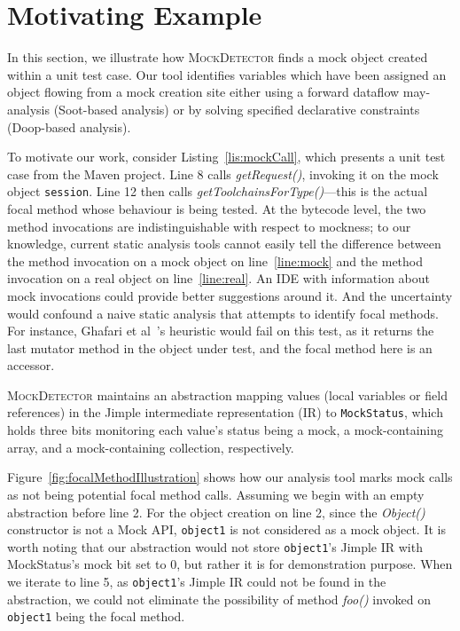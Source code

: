 \section{Motivating Example}
\label{sec:motivating-example}

In this section, we illustrate how \textsc{MockDetector} finds a mock object created within a unit test case. Our tool identifies variables which have been assigned an object flowing from a mock creation site either using a forward dataflow may-analysis (Soot-based analysis) or by solving specified declarative constraints (Doop-based analysis).


To motivate our work, consider Listing~\ref{lis:mockCall}, which presents a unit test case from the Maven project. Line 8 calls \textit{getRequest()}, invoking it on the mock object \texttt{session}. Line 12 then calls \textit{getToolchainsForType()}---this is the actual focal method whose behaviour is being tested. At the bytecode level, the two method invocations are indistinguishable with respect to mockness; to our knowledge, current static analysis tools cannot easily tell the difference between the method invocation on a mock object on line~\ref{line:mock} and the method invocation on a real object on line~\ref{line:real}. An IDE with information about mock invocations could provide better suggestions around it. And the uncertainty would confound a naive static analysis that attempts to identify focal methods. For instance, Ghafari et al~\cite{ghafari15:_autom}'s heuristic would fail on this test, as it returns the last mutator method in the object under test, and the focal method here is an accessor. 


\textsc{MockDetector} maintains an abstraction mapping values (local variables or field references) in the Jimple intermediate representation (IR) to \texttt{MockStatus}, which holds three bits monitoring each value's status being a mock, a mock-containing array, and a mock-containing collection, respectively.

Figure~\ref{fig:focalMethodIllustration} shows how our analysis tool marks mock calls as not being potential focal method calls. Assuming we begin with an empty abstraction before line 2. For the object creation on line 2, since the \textit{Object()} constructor is not a Mock API, \texttt{object1} is not considered as a mock object. It is worth noting that our abstraction would not store \texttt{object1}'s Jimple IR with MockStatus's mock bit set to 0, but rather it is for demonstration purpose. When we iterate to line 5, as \texttt{object1}'s Jimple IR could not be found in the abstraction, we could not eliminate the possibility of method \textit{foo()} invoked on \texttt{object1} being the focal method.

